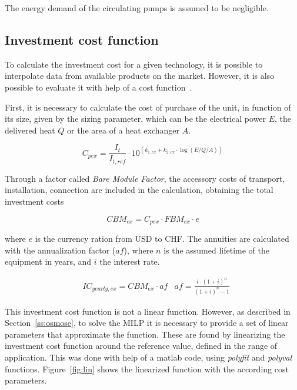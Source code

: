 \documentclass{article}
\begin{document}
The energy demand of the circulating pumps is assumed to be negligible. 

\subsection{Investment cost function}\label{ss:ic}
To calculate the investment cost for a given technology, it is possible to interpolate data from available products on the market. However, it is also possible to evaluate it with help of a cost function~\cite{turtonrichardc.bailierichardwhitingwallace.AnalysisSynthesisDesign2003}.

First, it is necessary to calculate the cost of purchase of the unit, in function of its size, given by the sizing parameter, which can be the electrical power $E$, the delivered heat $Q$ or the area of a heat exchanger $A$.

\begin{equation}
C_{pex} = \frac{I_{t}}{I_{t,ref}} \cdot 10^ {(k_{1,ex} + k_{2,ex} \cdot \log(E/Q/A))}
\end{equation}

Through a factor called \emph{Bare Module Factor}, the accessory costs of transport, installation, connection are included in the calculation, obtaining the total investment costs

\begin{equation}
CBM_{ex} = C_{pex} \cdot FBM_{ex} \cdot e 
\end{equation}

where $e$ is the currency ration from USD to CHF. The annuities are calculated with the annualization factor ($af$), where $n$ is the assumed lifetime of the equipment in years, and $i$ the interest rate. 

\begin{align}
	& IC_{yearly,ex} = CBM_{ex} \cdot af 
	& af = \frac{i \cdot (1 + i)^n}{(1 + i)^n - 1}
\end{align}

This investment cost function is not a linear function. However, as described in Section~\ref{ss:osmose}, to solve the MILP it is necessary to provide a set of linear parameters that approximate the function. These are found by linearizing the investment cost function around the reference value, defined in the range of application. This was done with help of a matlab code, using \textit{polyfit} and \textit{polyval} functions. Figure~\ref{fig:lin} shows the linearized function with the according cost parameters.
\end{document}

